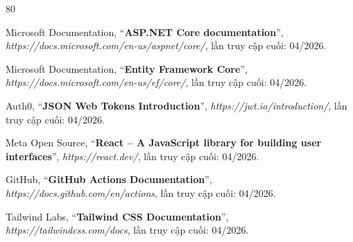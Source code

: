 \documentclass[a4paper]{article}
\begin{document}
\begin{thebibliography}{80}

Microsoft Documentation,
``\textbf{ASP.NET Core documentation}'',
\textit{https://docs.microsoft.com/en-us/aspnet/core/},
lần truy cập cuối: 04/2026.

Microsoft Documentation,
``\textbf{Entity Framework Core}'',
\textit{https://docs.microsoft.com/en-us/ef/core/},
lần truy cập cuối: 04/2026.

Auth0,
``\textbf{JSON Web Tokens Introduction}'',
\textit{https://jwt.io/introduction/},
lần truy cập cuối: 04/2026.

Meta Open Source,
``\textbf{React -- A JavaScript library for building user interfaces}'',
\textit{https://react.dev/},
lần truy cập cuối: 04/2026.

GitHub,
``\textbf{GitHub Actions Documentation}'',
\textit{https://docs.github.com/en/actions},
lần truy cập cuối: 04/2026.

Tailwind Labs,
``\textbf{Tailwind CSS Documentation}'',
\textit{https://tailwindcss.com/docs},
lần truy cập cuối: 04/2026.

\end{thebibliography}
\end{document}
